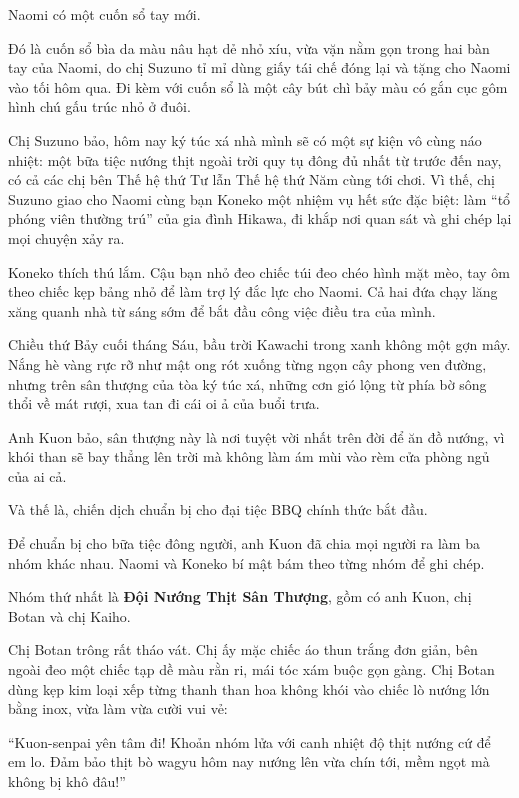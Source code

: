 \documentclass[../main.tex]{subfiles}
\begin{document}

Naomi có một cuốn sổ tay mới.

Đó là cuốn sổ bìa da màu nâu hạt dẻ nhỏ xíu, vừa vặn nằm gọn trong hai bàn tay của Naomi, do chị Suzuno tỉ mỉ dùng giấy tái chế đóng lại và tặng cho Naomi vào tối hôm qua. Đi kèm với cuốn sổ là một cây bút chì bảy màu có gắn cục gôm hình chú gấu trúc nhỏ ở đuôi.

Chị Suzuno bảo, hôm nay ký túc xá nhà mình sẽ có một sự kiện vô cùng náo nhiệt: một bữa tiệc nướng thịt ngoài trời quy tụ đông đủ nhất từ trước đến nay, có cả các chị bên Thế hệ thứ Tư lẫn Thế hệ thứ Năm cùng tới chơi. Vì thế, chị Suzuno giao cho Naomi cùng bạn Koneko một nhiệm vụ hết sức đặc biệt: làm ``tổ phóng viên thường trú'' của gia đình Hikawa, đi khắp nơi quan sát và ghi chép lại mọi chuyện xảy ra.

Koneko thích thú lắm. Cậu bạn nhỏ đeo chiếc túi đeo chéo hình mặt mèo, tay ôm theo chiếc kẹp bảng nhỏ để làm trợ lý đắc lực cho Naomi. Cả hai đứa chạy lăng xăng quanh nhà từ sáng sớm để bắt đầu công việc điều tra của mình.

Chiều thứ Bảy cuối tháng Sáu, bầu trời Kawachi trong xanh không một gợn mây. Nắng hè vàng rực rỡ như mật ong rót xuống từng ngọn cây phong ven đường, nhưng trên sân thượng của tòa ký túc xá, những cơn gió lộng từ phía bờ sông thổi về mát rượi, xua tan đi cái oi ả của buổi trưa.

Anh Kuon bảo, sân thượng này là nơi tuyệt vời nhất trên đời để ăn đồ nướng, vì khói than sẽ bay thẳng lên trời mà không làm ám mùi vào rèm cửa phòng ngủ của ai cả.

Và thế là, chiến dịch chuẩn bị cho đại tiệc BBQ chính thức bắt đầu.

\ct

Để chuẩn bị cho bữa tiệc đông người, anh Kuon đã chia mọi người ra làm ba nhóm khác nhau. Naomi và Koneko bí mật bám theo từng nhóm để ghi chép.

Nhóm thứ nhất là \textbf{Đội Nướng Thịt Sân Thượng}, gồm có anh Kuon, chị Botan và chị Kaiho.

Chị Botan trông rất tháo vát. Chị ấy mặc chiếc áo thun trắng đơn giản, bên ngoài đeo một chiếc tạp dề màu rằn ri, mái tóc xám buộc gọn gàng. Chị Botan dùng kẹp kim loại xếp từng thanh than hoa không khói vào chiếc lò nướng lớn bằng inox, vừa làm vừa cười vui vẻ:

``Kuon-senpai yên tâm đi! Khoản nhóm lửa với canh nhiệt độ thịt nướng cứ để em lo. Đảm bảo thịt bò wagyu hôm nay nướng lên vừa chín tới, mềm ngọt mà không bị khô đâu!''
\end{document}
